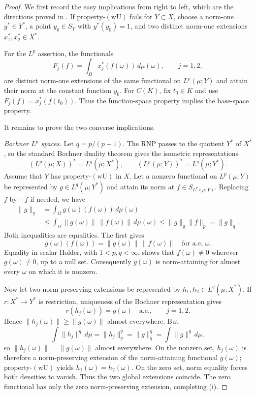 \documentclass[11pt]{article}
\newcommand{\wU}{\mathrm{(wU)}}
\newcommand{\dd}{\,d}
\begin{document}
\begin{proof}
We first record the easy implications from right to left, which are the
directions proved in \cite[Theorems 2.2.2--2.2.3]{DP}. If property-$\wU$ fails
for $Y\subset X$, choose a norm-one $y^*\in Y^*$, a point $y_0\in S_Y$ with
$y^*(y_0)=1$, and two distinct norm-one extensions $x_1^*,x_2^*\in X^*$.

For the $L^p$ assertion, the functionals
\[
F_j(f)=\int_\Omega x_j^*(f(\omega))\dd\mu(\omega),\qquad j=1,2,
\]
are distinct norm-one extensions of the same functional on $L^p(\mu;Y)$ and
attain their norm at the constant function $y_0$. For $C(K)$, fix $t_0\in K$
and use $F_j(f)=x_j^*(f(t_0))$. Thus the function-space property implies the
base-space property.

It remains to prove the two converse implications.

\medskip
\noindent\emph{Bochner $L^p$ spaces.}
Let $q=p/(p-1)$. The RNP passes to the quotient $Y^*$ of $X^*$, so the standard
Bochner duality theorem \cite{DU} gives the isometric representations
\[
(L^p(\mu;X))^*=L^q(\mu;X^*),\qquad
(L^p(\mu;Y))^*=L^q(\mu;Y^*).
\]
Assume that $Y$ has property-$\wU$ in $X$. Let a nonzero functional on
$L^p(\mu;Y)$ be represented by $g\in L^q(\mu;Y^*)$ and attain its norm at
$f\in S_{L^p(\mu;Y)}$. Replacing $f$ by $-f$ if needed, we have
\begin{align*}
\|g\|_q
 &=\int_\Omega g(\omega)(f(\omega))\dd\mu(\omega)\\
 &\leq\int_\Omega \|g(\omega)\|\,\|f(\omega)\|\dd\mu(\omega)
 \leq \|g\|_q\|f\|_p=\|g\|_q.
\end{align*}
Both inequalities are equalities. The first gives
\[
g(\omega)(f(\omega))=\|g(\omega)\|\,\|f(\omega)\|
\quad\text{for a.e. }\omega.
\]
Equality in scalar Holder, with $1<p,q<\infty$, shows that
$f(\omega)\neq0$ wherever $g(\omega)\neq0$, up to a null set. Consequently
$g(\omega)$ is norm-attaining for almost every $\omega$ on which it is
nonzero.

Now let two norm-preserving extensions be represented by
$h_1,h_2\in L^q(\mu;X^*)$. If $r:X^*\to Y^*$ is restriction, uniqueness of the
Bochner representation gives
\[
r(h_j(\omega))=g(\omega)\quad\text{a.e.},\qquad j=1,2.
\]
Hence $\|h_j(\omega)\|\geq\|g(\omega)\|$ almost everywhere. But
\[
\int\|h_j\|^q\dd\mu=\|h_j\|_q^q=\|g\|_q^q
=\int\|g\|^q\dd\mu,
\]
so $\|h_j(\omega)\|=\|g(\omega)\|$ almost everywhere. On the nonzero set,
$h_j(\omega)$ is therefore a norm-preserving extension of the norm-attaining
functional $g(\omega)$; property-$\wU$ yields $h_1(\omega)=h_2(\omega)$. On
the zero set, norm equality forces both densities to vanish. Thus the two
global extensions coincide. The zero functional has only the zero
norm-preserving extension, completing (i).


\end{proof}
\end{document}

